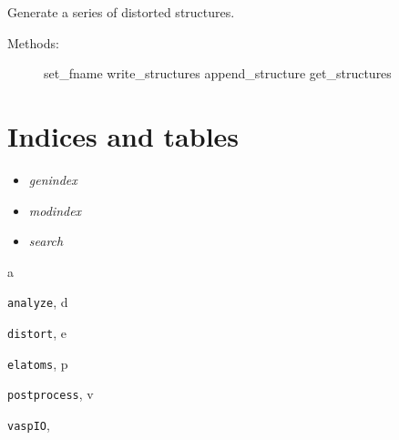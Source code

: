 \documentclass[letterpaper,10pt,english]{sphinxmanual}
\begin{document}

\begin{fulllineitems}
\label{index:elatoms.Structures}
Generate a series of distorted structures.
\begin{description}
\item[{Methods:}] \leavevmode
set\_fname
write\_structures
append\_structure
get\_structures

\end{description}

\end{fulllineitems}

\label{index:module-vaspIO}\label{index:module-postprocess}\label{index:module-analyze}

\begin{fulllineitems}
\label{index:analyze.Energy}
\end{fulllineitems}



\chapter{Indices and tables}
\label{index:indices-and-tables}\label{index:welcome-to-pylastic-s-documentation}\begin{itemize}
\item {} 
\emph{genindex}

\item {} 
\emph{modindex}

\item {} 
\emph{search}

\end{itemize}


\renewcommand{\indexname}{Python Module Index}
\begin{theindex}
\def\bigletter#1{{\Large\sffamily#1}\nopagebreak\vspace{1mm}}
\bigletter{a}
\item {\texttt{analyze}}, \pageref{index:module-analyze}
\indexspace
\bigletter{d}
\item {\texttt{distort}}, \pageref{index:module-distort}
\indexspace
\bigletter{e}
\item {\texttt{elatoms}}, \pageref{index:module-elatoms}
\indexspace
\bigletter{p}
\item {\texttt{postprocess}}, \pageref{index:module-postprocess}
\indexspace
\bigletter{v}
\item {\texttt{vaspIO}}, \pageref{index:module-vaspIO}
\end{theindex}

\renewcommand{\indexname}{Index}
\printindex
\end{document}
